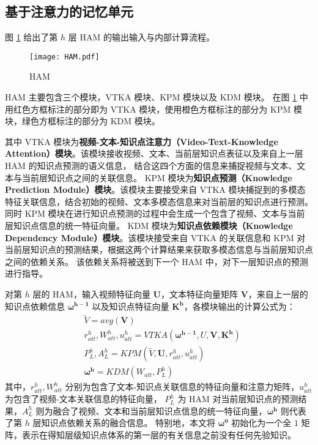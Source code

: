 \subsection{基于注意力的记忆单元}
    图 \ref{fig3.2} 给出了第 $h$ 层 HAM 的输出输入与内部计算流程。

    \begin{figure}[t]
        \centering
        \texttt{[image: HAM.pdf]}
        \caption{HAM}
        \label{fig3.2}
    \end{figure}

    HAM 主要包含三个模块，VTKA 模块、KPM 模块以及 KDM 模块。
    在图 \ref{fig3.2} 中用红色方框标注的部分即为 VTKA 模块，使用橙色方框标注的部分为 KPM 模块，绿色方框标注的部分为 KDM 模块。

    其中 VTKA 模块为\textbf{视频-文本-知识点注意力（Video-Text-Knowledge Attention）模块}。该模块接收视频、文本、当前层知识点表征以及来自上一层 HAM 的知识点预测的语义信息，
    结合这四个方面的信息来捕捉视频与文本、文本与当前层知识点之间的关联信息。
    KPM 模块为\textbf{知识点预测（Knowledge Prediction Module）模块}。该模块主要接受来自 VTKA 模块捕捉到的多模态特征关联信息，结合初始的视频、文本多模态信息来对当前层的知识点进行预测。
    同时 KPM 模块在进行知识点预测的过程中会生成一个包含了视频、文本与当前层知识点信息的统一特征向量。
    KDM 模块为\textbf{知识点依赖模块（Knowledge Dependency Module）模块}。该模块接受来自 VTKA 的关联信息和 KPM 对当前层知识点的预测结果，根据这两个计算结果来获取多模态信息与当前层知识点之间的依赖关系。
    该依赖关系将被送到下一个 HAM 中，对下一层知识点的预测进行指导。

    对第 $h$ 层的 HAM，输入视频特征向量 $\boldsymbol{U}$，文本特征向量矩阵 $\boldsymbol{V}$，来自上一层的知识点依赖信息 $\boldsymbol{\omega^{h - 1}}$ 以及知识点特征向量 $\boldsymbol{K^h}$，各模块输出的计算公式为：
    \begin{equation}
        \begin{aligned}
            &\tilde{V} = avg\left(\boldsymbol{V}\right) \\
            &r_{att}^h, W_{att}^h, u_{att}^h = VTKA\left(\boldsymbol{\omega^{h - 1}}, U, \boldsymbol{V}, \boldsymbol{K^h}\right) \\
            &P_L^h, A_L^h = KPM\left(\tilde{V}, \boldsymbol{U}, r_{att}^h, u_{att}^h\right) \\
            &\boldsymbol{\omega^h} = KDM\left(W_{att}, P_L^h\right)
        \end{aligned}
    \end{equation}
    其中，$r_{att}^{h}, W_{att}^h$ 分别为包含了文本-知识点关联信息的特征向量和注意力矩阵，$u_{att}^h$ 为包含了视频-文本关联信息的特征向量，
    $P_L^h$ 为 HAM 对当前层知识点的预测结果，$A_L^h$ 则为融合了视频、文本和当前层知识点信息的统一特征向量，$\boldsymbol{\omega^h}$ 则代表了第 $h$ 层知识点依赖关系的融合信息。
    特别地，本文将 $\boldsymbol{\omega^0}$ 初始化为一个全 $1$ 矩阵，表示在得知层级知识点体系的第一层的有关信息之前没有任何先验知识。

